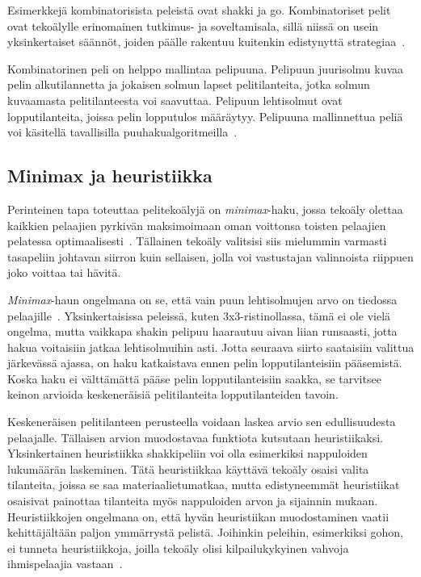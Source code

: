 \documentclass[12pt,finnish]{tktltiki2}
\theoremstyle{definition}
\theoremstyle{remark}
\begin{document}
Esimerkkejä kombinatorisista peleistä ovat shakki ja go. Kombinatoriset pelit ovat tekoälylle erinomainen tutkimus- ja soveltamisala, sillä niissä on usein yksinkertaiset säännöt, joiden päälle rakentuu kuitenkin edistynyttä strategiaa~\cite{browne}.

Kombinatorinen peli on helppo mallintaa pelipuuna. Pelipuun juurisolmu kuvaa pelin alkutilannetta ja jokaisen solmun lapset pelitilanteita, jotka solmun kuvaamasta pelitilanteesta voi saavuttaa. Pelipuun lehtisolmut ovat lopputilanteita, joissa pelin lopputulos määräytyy. Pelipuuna mallinnettua peliä voi käsitellä tavallisilla puuhakualgoritmeilla~\cite{aima}.

\subsection{Minimax ja heuristiikka}

Perinteinen tapa toteuttaa pelitekoälyjä on \textit{minimax}-haku, jossa tekoäly olettaa kaikkien pelaajien pyrkivän maksimoimaan oman voittonsa toisten pelaajien pelatessa optimaalisesti~\cite{aima}. Tällainen tekoäly valitsisi siis mielummin varmasti tasapeliin johtavan siirron kuin sellaisen, jolla voi vastustajan valinnoista riippuen joko voittaa tai hävitä.

\textit{Minimax}-haun ongelmana on se, että vain puun lehtisolmujen arvo on tiedossa pelaajille~\cite{aima}. Yksinkertaisissa peleissä, kuten 3x3-ristinollassa, tämä ei ole vielä ongelma, mutta vaikkapa shakin pelipuu haarautuu aivan liian runsaasti, jotta hakua voitaisiin jatkaa lehtisolmuihin asti. Jotta seuraava siirto saataisiin valittua järkevässä ajassa, on haku katkaistava ennen pelin lopputilanteisiin pääsemistä. Koska haku ei välttämättä pääse pelin lopputilanteisiin saakka, se tarvitsee keinon arvioida keskeneräisiä pelitilanteita lopputilanteiden tavoin.

Keskeneräisen pelitilanteen perusteella voidaan laskea arvio sen edullisuudesta pelaajalle. Tällaisen arvion muodostavaa funktiota kutsutaan heuristiikaksi. Yksinkertainen heuristiikka shakkipeliin voi olla esimerkiksi nappuloiden lukumäärän laskeminen. Tätä heuristiikkaa käyttävä tekoäly osaisi valita tilanteita, joissa se saa materiaalietumatkaa, mutta edistyneemmät heuristiikat osaisivat painottaa tilanteita myös nappuloiden arvon ja sijainnin mukaan. Heuristiikkojen ongelmana on, että hyvän heuristiikan muodostaminen vaatii kehittäjältään paljon ymmärrystä pelistä. Joihinkin peleihin, esimerkiksi gohon, ei tunneta heuristiikkoja, joilla tekoäly olisi kilpailukykyinen vahvoja ihmispelaajia vastaan~\cite{browne}.
\end{document}
